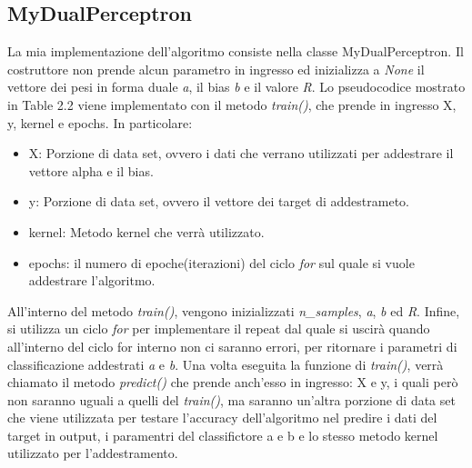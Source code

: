 \documentclass{article}
\begin{document}
    \subsection{MyDualPerceptron}
    La mia implementazione dell'algoritmo consiste nella classe MyDualPerceptron. 
	Il costruttore non prende alcun parametro in ingresso ed inizializza a \textit{None} il vettore dei pesi in forma duale \textit{a}, il bias \textit{b} 
	e il valore \textit{R}. Lo pseudocodice mostrato in Table 2.2 viene implementato con il metodo \textit{train()}, 
	che prende in ingresso X, y, kernel e epochs. In particolare:
    \begin{itemize}
    	\item X: Porzione di data set, ovvero i dati che verrano utilizzati per addestrare il vettore alpha e il bias.
    	\item y: Porzione di data set, ovvero il vettore dei target di addestrameto.
    	\item kernel: Metodo kernel che verrà utilizzato.
    	\item epochs: il numero di epoche(iterazioni) del ciclo \textit{for} sul quale si vuole addestrare l'algoritmo.
    \end{itemize}
	All'interno del metodo \textit{train()}, vengono inizializzati \textit{n\_samples}, \textit{a}, \textit{b} ed \textit{R}. Infine, si utilizza un ciclo \textit{for} per implementare il repeat dal quale si uscirà quando all'interno del ciclo for interno non ci saranno errori, per ritornare i parametri di classificazione addestrati \textit{a} e \textit{b}.
    Una volta eseguita la funzione di \textit{train()}, verrà chiamato il metodo \textit{predict()} che prende anch'esso in ingresso: X e y, i quali però non saranno uguali a quelli del \textit{train()}, ma saranno un'altra porzione di data set che viene utilizzata per testare l'accuracy dell'algoritmo nel predire i dati del target in output, i paramentri del classifictore {a} e {b} e lo stesso metodo kernel utilizzato per l'addestramento.
\end{document}
